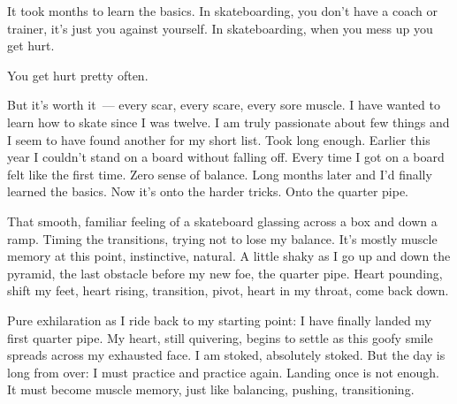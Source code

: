It took months to learn the basics. In skateboarding, you don't have a coach or trainer, it's just you against yourself. In skateboarding, when you mess up you get hurt.

You get hurt pretty often.

But it's worth it~--- every scar, every scare, every sore muscle. I have wanted to learn how to skate since I was twelve. I am truly passionate about few things and I seem to have found another for my short list. Took long enough. Earlier this year I couldn't stand on a board without falling off. Every time I got on a board felt like the first time. Zero sense of balance. Long months later and I'd finally learned the basics. Now it's onto the harder tricks. Onto the quarter pipe.

That smooth, familiar feeling of a skateboard glassing across a box and down a ramp. Timing the transitions, trying not to lose my balance. It's mostly muscle memory at this point, instinctive, natural. A little shaky as I go up and down the pyramid, the last obstacle before my new foe, the quarter pipe. Heart pounding, shift my feet, heart rising, transition, pivot, heart in my throat, come back down.

Pure exhilaration as I ride back to my starting point: I have finally landed my first quarter pipe. My heart, still quivering, begins to settle as this goofy smile spreads across my exhausted face. I am stoked, absolutely stoked. But the day is long from over: I must practice and practice again. Landing once is not enough. It must become muscle memory, just like balancing, pushing, transitioning.
